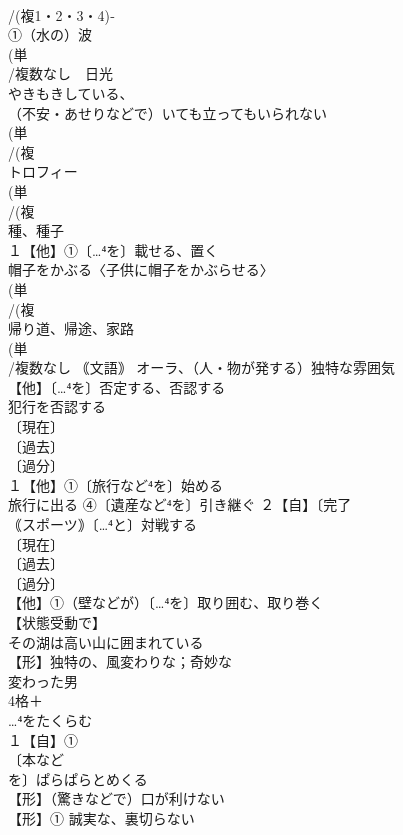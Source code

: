 \documentclass[8pt]{extreport}
\begin{document}
\begin{CJK}{UTF8}{min}
\\	/(複1・2・3・4)‐
\\	①（水の）波 
\\	(単
\\	/複数なし　日光 
\\	やきもきしている、
\\	（不安・あせりなどで）いても立ってもいられない　
\\	(単
\\	/(複
\\	トロフィー 
\\	(単
\\	/(複
\\	種、種子 
\\	１【他】①〔…⁴を〕載せる、置く 
\\	帽子をかぶる〈子供に帽子をかぶらせる〉
\\	(単
\\	/(複
\\	帰り道、帰途、家路 
\\	(単
\\	/複数なし ｟文語｠ オーラ、（人・物が発する）独特な雰囲気 
\\	【他】〔…⁴を〕否定する、否認する 
\\	犯行を否認する 
\\	〔現在〕
\\	〔過去〕
\\	〔過分〕
\\	１【他】①〔旅行など⁴を〕始める 
\\	旅行に出る ④〔遺産など⁴を〕引き継ぐ ２【自】〔完了
\\	｟スポーツ｠〔…⁴と〕対戦する 
\\	〔現在〕
\\	〔過去〕
\\	〔過分〕
\\	【他】①（壁などが）〔…⁴を〕取り囲む、取り巻く 
\\	【状態受動で】
\\	その湖は高い山に囲まれている
\\	【形】独特の、風変わりな；奇妙な 
\\	変わった男
\\	4格＋
\\	…⁴をたくらむ
\\	１【自】①
\\	〔本など
\\	を〕ぱらぱらとめくる
\\	【形】（驚きなどで）口が利けない 
\\	【形】① 誠実な、裏切らない

\end{CJK}
\end{document}
